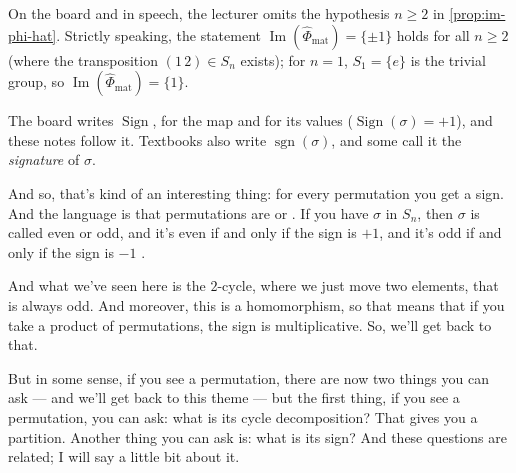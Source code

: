 \begin{aiNote}[Missing Edge Case: \texorpdfstring{$n = 1$}{n = 1}]
On the board and in speech, the lecturer omits the hypothesis $n \ge 2$ in \cref{prop:im-phi-hat}. Strictly speaking, the statement $\operatorname{Im}(\hat{\Phi}_{\text{mat}}) = \{\pm 1\}$ holds for all $n \ge 2$ (where the transposition $(1\,2) \in S_n$ exists); for $n = 1$, $S_1 = \{e\}$ is the trivial group, so $\operatorname{Im}(\hat{\Phi}_{\text{mat}}) = \{1\}$.
\end{aiNote}

\begin{aiNote}
The board writes $\operatorname{Sign}$, for the map and for its values ($\operatorname{Sign}(\sigma) = +1$), and these notes follow it. Textbooks also write $\operatorname{sgn}(\sigma)$, and some call it the \emph{signature} of $\sigma$.
\end{aiNote}

\begin{speech}[00:23:44 - 00:25:00]
And so, that's kind of an interesting thing: for every permutation you get a sign. And the language is that permutations are  or . If you have $\sigma$ in $S_n$, then $\sigma$ is called even or odd, and it's even if and only if the sign is $+1$, and it's odd if and only if the sign is $-1$ .

And what we've seen here is the $2$-cycle, where we just move two elements, that is always odd. And moreover, this is a homomorphism, so that means that if you take a product of permutations, the sign is multiplicative. So, we'll get back to that.

But in some sense, if you see a permutation, there are now two things you can ask --- and we'll get back to this theme --- but the first thing, if you see a permutation, you can ask: what is its cycle decomposition? That gives you a partition. Another thing you can ask is: what is its sign? And these questions are related; I will say a little bit about it.
\end{speech}

